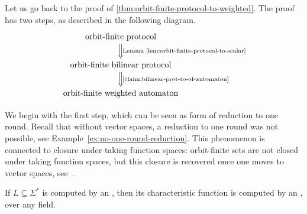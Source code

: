 Let us go back to the proof of \cref{thm:orbit-finite-protocol-to-weighted}. The proof has two steps, as described in the following diagram.
\[
\begin{tikzcd}
\text{orbit-finite protocol}
\ar[d,Rightarrow,"\text{Lemma~\ref{lem:orbit-finite-protocol-to-scalar}}"]
\\
\text{orbit-finite bilinear protocol}
\ar[d,Rightarrow, "\text{\cref{claim:bilinear-prot-to-of-automaton}}"]
\\
\text{orbit-finite weighted automaton}
\end{tikzcd}
\]

We begin with the first step, which can be seen as form of reduction to one round. Recall that without vector spaces, a reduction to one round was not possible, see Example~\ref{ex:no-one-round-reduction}. This phenomenon is connected to closure under taking function spaces: orbit-finite sets are not closed under taking function spaces, but this closure is recovered once one moves to vector spaces, see~\cite[Section 8.3]{bojanczyk_slightly}. 

\begin{lemma}\label{lem:orbit-finite-protocol-to-scalar}
  If $L \subseteq \Sigma^*$ is computed by an , then its characteristic function is computed by an , over any field.
\end{lemma}


